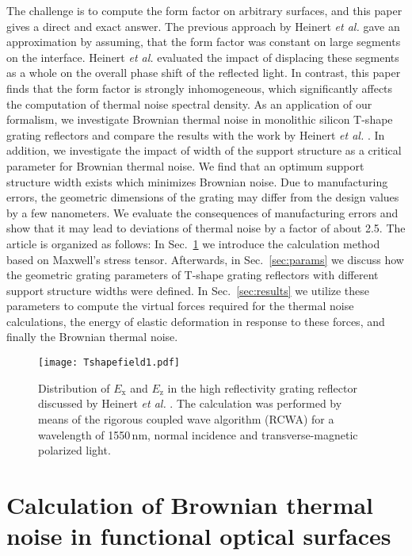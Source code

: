 \documentclass[twocolumn,secnumarabic,amssymb, nobibnotes, aps, prd, showpacs]{revtex4-1}
\begin{document}
\noindent The challenge is to compute the form factor on arbitrary surfaces, and this paper gives a direct and exact answer. The previous approach by Heinert \textit{et al.} \cite{Hei2013} gave an approximation by assuming, that the form factor was constant on large segments on the interface. Heinert \textit{et al.} evaluated the impact of displacing these segments as a whole on the overall phase shift of the reflected light. In contrast, this paper finds that the form factor is strongly inhomogeneous, which significantly affects the computation of thermal noise spectral density. \newline
As an application of our formalism, we investigate Brownian thermal noise in monolithic silicon T-shape grating reflectors and compare the results with the work by Heinert \textit{et al.} \cite{Hei2013}. In addition, we investigate the impact of width of the support structure as a critical parameter for Brownian thermal noise. We find that an optimum support structure width exists which minimizes Brownian noise. Due to manufacturing errors, the geometric dimensions of the grating may differ from the design values by a few nanometers. We evaluate the consequences of manufacturing errors and show that it may lead to deviations of thermal noise by a factor of about 2.5.
\newline
The article is organized as follows: In Sec.~\ref{sec:calcul} we introduce the calculation method based on Maxwell's stress tensor. Afterwards, in Sec.~\ref{sec:params} we discuss how the geometric grating parameters of T-shape grating reflectors with different support structure widths were defined. In Sec.~\ref{sec:results} we utilize these parameters to compute the virtual forces required for the thermal noise calculations, the energy of elastic deformation in response to these forces, and finally the Brownian thermal noise. 

\begin{figure}[t]
	\centering
		\texttt{[image: Tshapefield1.pdf]}
			\caption{Distribution of $E_\mathrm{x}$ and $E_\mathrm{z}$ in the high reflectivity grating reflector discussed by Heinert \textit{et al.} \cite{Hei2013}. The calculation was performed by means of the rigorous coupled wave algorithm (RCWA) \cite{Moh1981} for a wavelength of 1550\,nm, normal incidence and transverse-magnetic polarized light.}
	\label{fig:Tshapefield}
\end{figure}

\section{Calculation of Brownian thermal noise in functional optical surfaces}
\label{sec:calcul}
\end{document}
